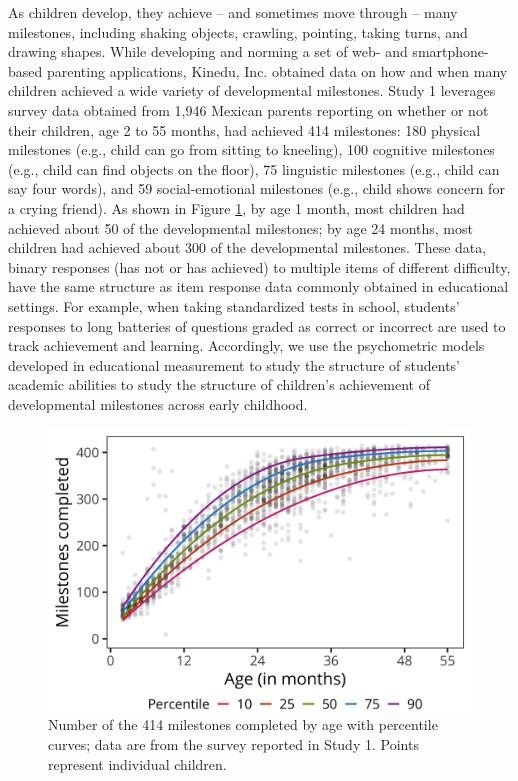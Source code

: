 \documentclass[man]{apa7}
\begin{document}
As children develop, they achieve -- and sometimes move through -- many milestones,
including shaking objects, crawling, pointing, taking turns, and drawing
shapes. While developing and norming a set of web- and smartphone-based
parenting applications, Kinedu, Inc. obtained data on how and when many
children achieved a wide variety of developmental milestones. Study 1
leverages survey data obtained from 1,946 Mexican parents reporting on whether or not
their children, age 2 to 55 months, had achieved 414 milestones: 180
physical milestones (e.g., child can go from sitting to kneeling), 100
cognitive milestones (e.g., child can find objects on the floor), 75
linguistic milestones (e.g., child can say four words), and 59
social-emotional milestones (e.g., child shows concern for a crying
friend). As shown in Figure \ref{fig:partage}, by age 1 month, most
children had achieved about 50 of the developmental milestones; by
age 24 months, most children had achieved about 300 of the developmental
milestones. These data, binary responses (has not or has achieved) to
multiple items of different difficulty, have the same structure as item
response data commonly obtained in educational settings. For example,
when taking standardized tests in school, students' responses to long
batteries of questions graded as correct or incorrect are used to track
achievement and learning. Accordingly, we use the psychometric models
developed in educational measurement to study the structure of students'
academic abilities to study the structure of children's achievement of
developmental milestones across early childhood.

\begin{figure}
\centering
\includegraphics[width=1\columnwidth]{figures/01_achieve_by_age.png}
\caption{Number of the 414 milestones completed by age with percentile curves; data are from the survey reported in Study 1. Points represent individual children.}
\label{fig:partage}
\end{figure}
\end{document}
